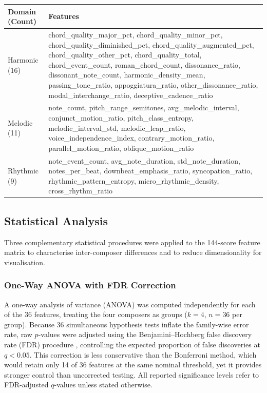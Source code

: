 \documentclass[]{interact}
\theoremstyle{plain}
\theoremstyle{definition}
\theoremstyle{remark}
\begin{document}
\begin{table}[ht]
{\begin{tabular}{lp{10cm}} \toprule
  Domain (Count) & Features \\ \midrule
  Harmonic (16) & chord\_quality\_major\_pct, chord\_quality\_minor\_pct, chord\_quality\_diminished\_pct, chord\_quality\_augmented\_pct, chord\_quality\_other\_pct, chord\_quality\_total, chord\_event\_count, roman\_chord\_count, dissonance\_ratio, dissonant\_note\_count, harmonic\_density\_mean, passing\_tone\_ratio, appoggiatura\_ratio, other\_dissonance\_ratio, modal\_interchange\_ratio, deceptive\_cadence\_ratio \\
  Melodic (11) & note\_count, pitch\_range\_semitones, avg\_melodic\_interval, conjunct\_motion\_ratio, pitch\_class\_entropy, melodic\_interval\_std, melodic\_leap\_ratio, voice\_independence\_index, contrary\_motion\_ratio, parallel\_motion\_ratio, oblique\_motion\_ratio \\
  Rhythmic (9) & note\_event\_count, avg\_note\_duration, std\_note\_duration, notes\_per\_beat, downbeat\_emphasis\_ratio, syncopation\_ratio, rhythmic\_pattern\_entropy, micro\_rhythmic\_density, cross\_rhythm\_ratio \\ \bottomrule
\end{tabular}}
\label{tab:features}
\end{table}

\subsection{Statistical Analysis}

Three complementary statistical procedures were applied to the 144-score feature
matrix to characterise inter-composer differences and to reduce dimensionality
for visualisation.

\subsubsection{One-Way ANOVA with FDR Correction}

A one-way analysis of variance (ANOVA) was computed independently for each of the
36 features, treating the four composers as groups ($k = 4$, $n = 36$ per group).
Because 36 simultaneous hypothesis tests inflate the family-wise error rate,
raw $p$-values were adjusted using the Benjamini--Hochberg false discovery rate
(FDR) procedure \citep{Benjamini1995}, controlling the expected proportion of
false discoveries at $q < 0.05$. This correction is less conservative than the
Bonferroni method, which would retain only 14 of 36 features at the same nominal
threshold, yet it provides stronger control than uncorrected testing. All
reported significance levels refer to FDR-adjusted $q$-values unless stated
otherwise.
\end{document}
